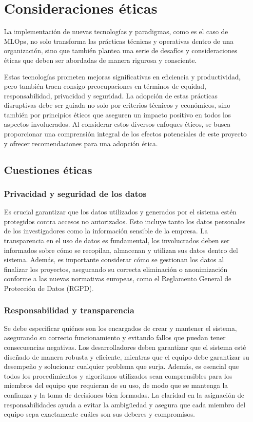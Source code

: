 \section{Consideraciones éticas}
La implementación de nuevas tecnologías y paradigmas, como 
es el caso de MLOps, no solo transforma las prácticas técnicas y 
operativas dentro de una organización, sino que también plantea una 
serie de desafíos y consideraciones éticas que deben ser abordadas 
de manera rigurosa y consciente.

Estas tecnologías prometen mejoras significativas en eficiencia 
y productividad, pero también traen consigo preocupaciones en 
términos de equidad, responsabilidad, privacidad y seguridad. La 
adopción de estas prácticas disruptivas debe ser guiada no solo 
por criterios técnicos y económicos, sino también por principios 
éticos que aseguren un impacto positivo en todos los aspectos 
involucrados. Al considerar estos diversos enfoques éticos, se 
busca proporcionar una comprensión integral de los efectos 
potenciales de este proyecto y ofrecer recomendaciones para 
una adopción ética.

\subsection{Cuestiones éticas}
\subsubsection{Privacidad y seguridad de los datos}
Es crucial garantizar que los datos utilizados y generados por el 
sistema estén protegidos contra accesos no autorizados. Esto incluye 
tanto los datos personales de los investigadores como la información sensible 
de la empresa. La transparencia en el uso de datos es fundamental, 
los involucrados deben ser informados sobre cómo se recopilan, almacenan 
y utilizan sus datos dentro del sistema. Además, es importante considerar 
cómo se gestionan los datos al finalizar los proyectos, asegurando su correcta 
eliminación o anonimización conforme a las nuevas normativas europeas, 
como el Reglamento General de Protección de Datos (RGPD).

\subsubsection{Responsabilidad y transparencia}
Se debe especificar quiénes son los encargados de crear y mantener el sistema, 
asegurando su correcto funcionamiento y evitando fallos que puedan tener 
consecuencias negativas. Los desarrolladores deben garantizar que el sistema esté 
diseñado de manera robusta y eficiente, mientras que el equipo debe garantizar su desempeño 
y solucionar cualquier problema que surja. Además, es esencial que todos los procedimientos 
y algoritmos utilizados sean comprensibles para los miembros del equipo que requieran de su uso, 
de modo que se mantenga la confianza y la toma de decisiones bien formadas. La claridad en la 
asignación de responsabilidades ayuda a evitar la ambigüedad y asegura que cada miembro del 
equipo sepa exactamente cuáles son sus deberes y compromisos.

